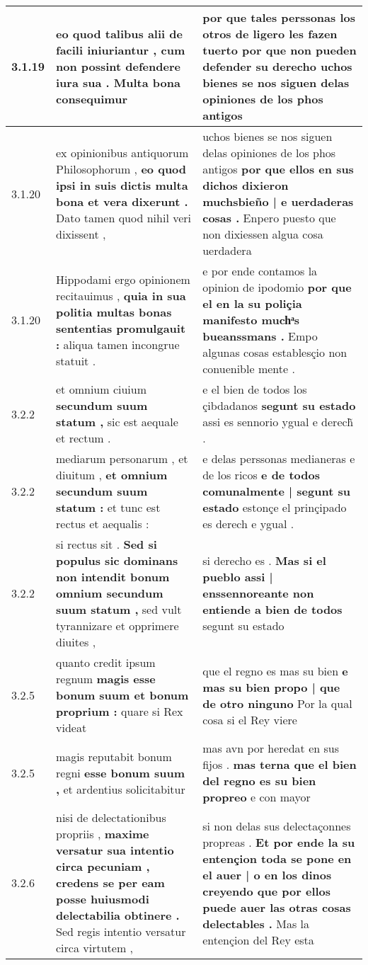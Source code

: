 \begin{tabular}{|p{1cm}|p{6.5cm}|p{6.5cm}|}
3.1.19 & eo quod talibus alii de facili iniuriantur , \textbf{ cum non possint defendere iura sua . } Multa bona consequimur & por que tales perssonas los otros de ligero les fazen tuerto \textbf{ por que non pueden defender su derecho } uchos bienes se nos siguen delas opiniones de los phos antigos \\\hline
3.1.20 & ex opinionibus antiquorum Philosophorum , \textbf{ eo quod ipsi in suis dictis multa bona et vera dixerunt . } Dato tamen quod nihil veri dixissent , & uchos bienes se nos siguen delas opiniones de los phos antigos \textbf{ por que ellos en sus dichos dixieron muchsbieño | e uerdaderas cosas . } Enpero puesto que non dixiessen algua cosa uerdadera \\\hline
3.1.20 & Hippodami ergo opinionem recitauimus , \textbf{ quia in sua politia multas bonas sententias promulgauit : } aliqua tamen incongrue statuit . & e por ende contamos la opinion de ipodomio \textbf{ por que el en la su poliçia manifesto muchͣs bueanssmans . } Empo algunas cosas establesçio non conuenible mente . \\\hline
3.2.2 & et omnium ciuium \textbf{ secundum suum statum , } sic est aequale et rectum . & e el bien de todos los çibdadanos \textbf{ segunt su estado } assi es sennorio ygual e derech̃ . \\\hline
3.2.2 & mediarum personarum , et diuitum , \textbf{ et omnium secundum suum statum : } et tunc est rectus et aequalis : & e delas perssonas medianeras e de los ricos \textbf{ e de todos comunalmente | segunt su estado } estonçe el prinçipado es derech e ygual . \\\hline
3.2.2 & si rectus sit . \textbf{ Sed si populus sic dominans non intendit bonum omnium secundum suum statum , } sed vult tyrannizare et opprimere diuites , & si derecho es . \textbf{ Mas si el pueblo assi | enssennoreante non entiende a bien de todos } segunt su estado \\\hline
3.2.5 & quanto credit ipsum regnum \textbf{ magis esse bonum suum et bonum proprium : } quare si Rex videat & que el regno es mas su bien \textbf{ e mas su bien propo | que de otro ninguno } Por la qual cosa si el Rey viere \\\hline
3.2.5 & magis reputabit bonum regni \textbf{ esse bonum suum , } et ardentius solicitabitur & mas avn por heredat en sus fijos . \textbf{ mas terna que el bien del regno es su bien propreo } e con mayor \\\hline
3.2.6 & nisi de delectationibus propriis , \textbf{ maxime versatur sua intentio circa pecuniam , credens se per eam posse huiusmodi delectabilia obtinere . } Sed regis intentio versatur circa virtutem , & si non delas sus delectaçonnes propreas . \textbf{ Et por ende la su entençion toda se pone en el auer | o en los dinos creyendo que por ellos puede auer las otras cosas delectables . } Mas la entençion del Rey esta \\\hline

\end{tabular}
